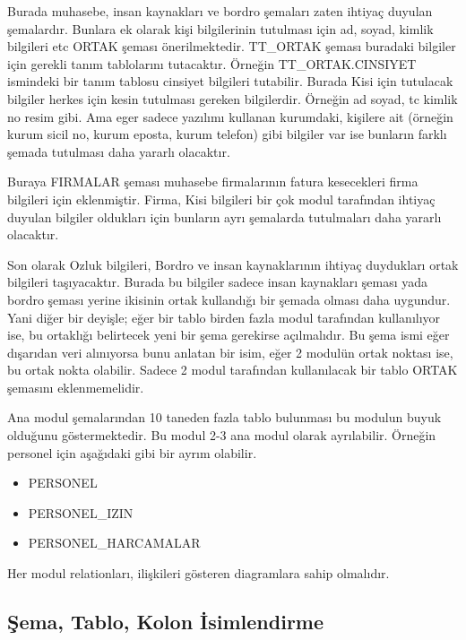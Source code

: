 \documentclass[10pt,a4paper,draft]{article}
\begin{document}
Burada muhasebe, insan kaynakları ve bordro şemaları zaten ihtiyaç duyulan şemalardır.
Bunlara ek olarak kişi bilgilerinin tutulması için ad, soyad, kimlik bilgileri etc ORTAK şeması
önerilmektedir. TT\_ORTAK şeması buradaki bilgiler için gerekli tanım tablolarını tutacaktır.
Örneğin TT\_ORTAK.CINSIYET ismindeki bir tanım tablosu cinsiyet bilgileri tutabilir.
Burada Kisi için tutulacak bilgiler herkes için kesin tutulması gereken bilgilerdir. 
Örneğin ad soyad, tc kimlik no resim gibi. Ama eger sadece yazılımı kullanan kurumdaki,
kişilere ait  (örneğin kurum sicil no, kurum eposta, kurum telefon) gibi bilgiler  var ise 
bunların farklı şemada tutulması daha yararlı olacaktır. 

Buraya FIRMALAR şeması muhasebe firmalarının fatura kesecekleri firma bilgileri için eklenmiştir.
Firma, Kisi bilgileri bir çok modul tarafından ihtiyaç duyulan bilgiler oldukları için bunların
ayrı şemalarda tutulmaları daha yararlı olacaktır.

Son olarak Ozluk bilgileri, Bordro ve insan kaynaklarının ihtiyaç duydukları ortak bilgileri taşıyacaktır.
Burada bu bilgiler sadece insan kaynakları şeması yada bordro şeması yerine ikisinin ortak kullandığı
bir şemada olması daha uygundur.
Yani diğer bir deyişle; eğer bir tablo birden fazla modul tarafından kullanılıyor ise,
bu ortaklığı belirtecek yeni bir şema gerekirse açılmalıdır. 
Bu şema ismi eğer dışarıdan veri alınıyorsa bunu anlatan bir isim,
eğer 2 modulün ortak noktası ise, bu ortak nokta olabilir.
Sadece 2 modul tarafından kullanılacak bir tablo ORTAK şemasını eklenmemelidir.

Ana modul şemalarından 10 taneden fazla tablo bulunması bu modulun buyuk olduğunu göstermektedir.
Bu modul 2-3 ana modul olarak ayrılabilir. Örneğin personel için aşağıdaki gibi bir ayrım olabilir.
\begin{itemize}
\item PERSONEL
\item PERSONEL\_IZIN
\item PERSONEL\_HARCAMALAR
\end{itemize}




Her modul relationları, ilişkileri gösteren diagramlara sahip olmalıdır.



\subsection{Şema, Tablo, Kolon İsimlendirme}
\end{document}
